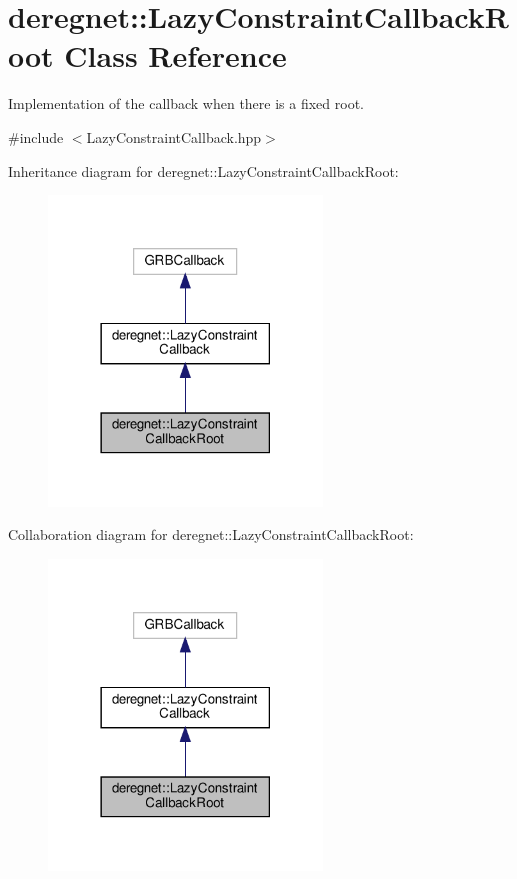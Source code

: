 \hypertarget{classderegnet_1_1LazyConstraintCallbackRoot}{}\section{deregnet\+:\+:Lazy\+Constraint\+Callback\+Root Class Reference}
\label{classderegnet_1_1LazyConstraintCallbackRoot}


Implementation of the callback when there is a fixed root.  




{\ttfamily \#include $<$Lazy\+Constraint\+Callback.\+hpp$>$}



Inheritance diagram for deregnet\+:\+:Lazy\+Constraint\+Callback\+Root\+:\nopagebreak
\begin{figure}[H]
\begin{center}
\leavevmode
\includegraphics[width=206pt]{classderegnet_1_1LazyConstraintCallbackRoot__inherit__graph}
\end{center}
\end{figure}


Collaboration diagram for deregnet\+:\+:Lazy\+Constraint\+Callback\+Root\+:\nopagebreak
\begin{figure}[H]
\begin{center}
\leavevmode
\includegraphics[width=206pt]{classderegnet_1_1LazyConstraintCallbackRoot__coll__graph}
\end{center}
\end{figure}
